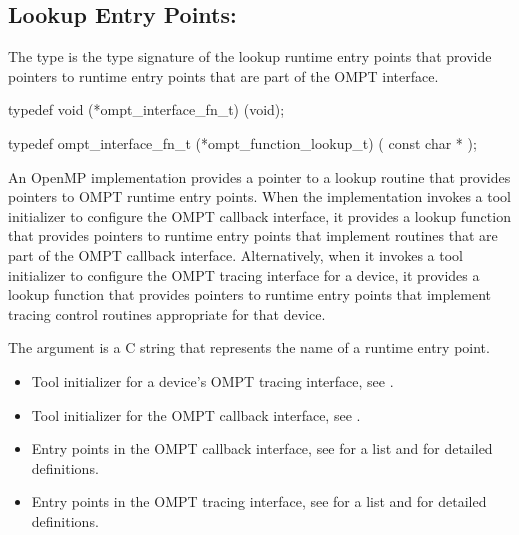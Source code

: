 \subsection{Lookup Entry Points: }
\label{sec:ompt_function_lookup_t}
\label{sec:ompt_function_lookup}

\summary
The  type is the type signature of the 
lookup runtime entry points that provide pointers to runtime entry 
points that are part of the OMPT interface.

\format
\begin{ccppspecific}
\begin{omptInquiry}
typedef void (*ompt_interface_fn_t) (void);

typedef ompt_interface_fn_t (*ompt_function_lookup_t) (
  const char *
);
\end{omptInquiry}
\end{ccppspecific}

\descr
An OpenMP implementation provides a pointer to a lookup routine that 
provides pointers to OMPT runtime entry points. When the implementation 
invokes a tool initializer to configure the OMPT callback interface, it 
provides a lookup function that provides pointers to runtime entry points 
that implement routines that are part of the OMPT callback interface. 
Alternatively, when it invokes a tool initializer to configure the OMPT 
tracing interface for a device, it provides a lookup function that provides
pointers to runtime entry points that implement tracing control routines 
appropriate for that device.

\argdesc
The  argument is a C string that represents 
the name of a runtime entry point.

\crossreferences
\begin{itemize}
\item Tool initializer for a device's OMPT tracing interface, 
see .

\item Tool initializer for the OMPT callback interface, 
see .

\item Entry points in the OMPT callback interface, see
   for a list and
   for detailed definitions.

\item Entry points in the OMPT tracing interface, see
   for a list and
   for detailed definitions.
\end{itemize}
